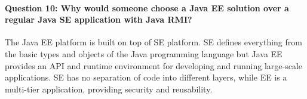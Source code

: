 \documentclass{ds-report}
\begin{document}
	\paragraph{Question 10: Why would someone choose a Java EE solution over a regular Java SE application with Java RMI?\\} 
	The Java EE platform is built on top of SE platform. SE defines everything from the basic types and objects of the Java programming language but Java EE provides an API and runtime environment for developing and running large-scale applications. SE has no separation of code into different layers, while EE is a multi-tier application, providing security and reusability.
	\clearpage
	
	
\end{document}
